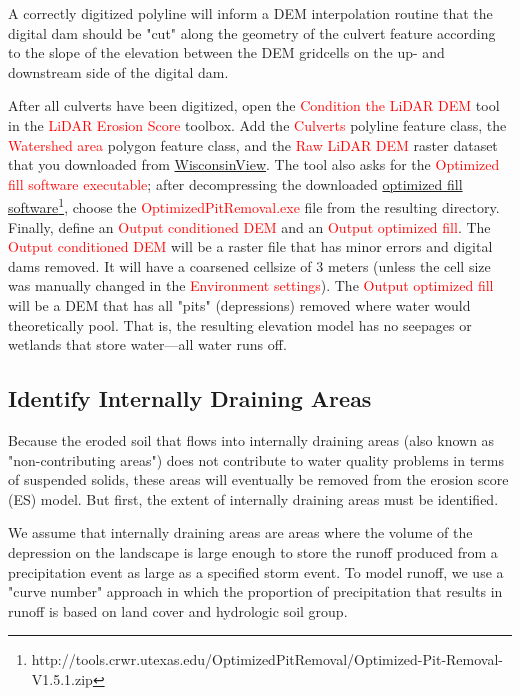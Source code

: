 \documentclass{article}
\newcommand{\toolPar}[1]{\textcolor{red}{#1}}
\begin{document}
		A correctly digitized polyline will inform a DEM interpolation routine that the digital dam should be "cut" along the geometry of the culvert feature according to the slope of the elevation between the DEM gridcells on the up- and downstream side of the digital dam.
		
		After all culverts have been digitized, open the \toolPar{Condition the LiDAR DEM} tool in the \toolPar{LiDAR Erosion Score} toolbox. Add the \toolPar{Culverts} polyline feature class, the \toolPar{Watershed area} polygon feature class, and the \toolPar{Raw LiDAR DEM} raster dataset that you downloaded from \href{http://www.wisconsinview.org/}{WisconsinView}. The tool also asks for the \toolPar{Optimized fill software executable}; after decompressing the downloaded \href{http://tools.crwr.utexas.edu/OptimizedPitRemoval/Optimized-Pit-Removal-V1.5.1.zip}{optimized fill software}\footnote{http://tools.crwr.utexas.edu/OptimizedPitRemoval/Optimized-Pit-Removal-V1.5.1.zip}, choose the \toolPar{OptimizedPitRemoval.exe} file from the resulting directory. Finally, define an \toolPar{Output conditioned DEM} and an \toolPar{Output optimized fill}. The \toolPar{Output conditioned DEM} will be a raster file that has minor errors and digital dams removed. It will have a coarsened cellsize of 3 meters (unless the cell size was manually changed in the \toolPar{Environment settings}). The \toolPar{Output optimized fill} will be a DEM that has all "pits" (depressions) removed where water would theoretically pool. That is, the resulting elevation model has no seepages or wetlands that store water---all water runs off.
	\subsection{Identify Internally Draining Areas}
		Because the eroded soil that flows into internally draining areas (also known as "non-contributing areas") does not contribute to water quality problems in terms of suspended solids, these areas will eventually be removed from the erosion score (ES) model. But first, the extent of internally draining areas must be identified.
		
		We assume that internally draining areas are areas where the volume of the depression on the landscape is large enough to store the runoff produced from a precipitation event as large as a specified storm event. To model runoff, we use a "curve number" approach in which the proportion of precipitation that results in runoff is based on land cover and hydrologic soil group.
\end{document}
